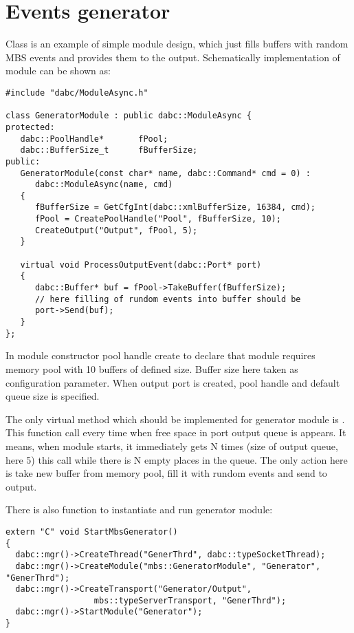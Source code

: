  

\section{Events generator}


Class  is an example of simple module design, 
which just fills buffers with random MBS 
events and provides them to the output. 
Schematically implementation of module can be shown as:

\begin{verbatim}
#include "dabc/ModuleAsync.h"

class GeneratorModule : public dabc::ModuleAsync {
protected:
   dabc::PoolHandle*       fPool;
   dabc::BufferSize_t      fBufferSize;
public:
   GeneratorModule(const char* name, dabc::Command* cmd = 0) :
      dabc::ModuleAsync(name, cmd)
   {
      fBufferSize = GetCfgInt(dabc::xmlBufferSize, 16384, cmd);
      fPool = CreatePoolHandle("Pool", fBufferSize, 10);
      CreateOutput("Output", fPool, 5);
   }

   virtual void ProcessOutputEvent(dabc::Port* port)
   {
      dabc::Buffer* buf = fPool->TakeBuffer(fBufferSize);
      // here filling of rundom events into buffer should be
      port->Send(buf);
   }
};
\end{verbatim}

In module constructor pool handle create to declare that module requires
memory pool with 10 buffers of defined size. Buffer size here 
taken as configuration parameter. When output port is created, pool handle and
default queue size is specified.

The only virtual method which should be implemented for generator module is
. This function call every time when free space in port
output queue is appears. It means, when module starts, it immediately gets 
N times (size of output queue, here 5) this call while there is N empty places in the queue.
The only action here is take new buffer from memory pool, fill it with rundom
events and send to output.    
  
There is also  function to instantiate and run generator module:
\begin{verbatim}
extern "C" void StartMbsGenerator()
{
  dabc::mgr()->CreateThread("GenerThrd", dabc::typeSocketThread);
  dabc::mgr()->CreateModule("mbs::GeneratorModule", "Generator", "GenerThrd");
  dabc::mgr()->CreateTransport("Generator/Output", 
                  mbs::typeServerTransport, "GenerThrd");
  dabc::mgr()->StartModule("Generator");
}
\end{verbatim}


